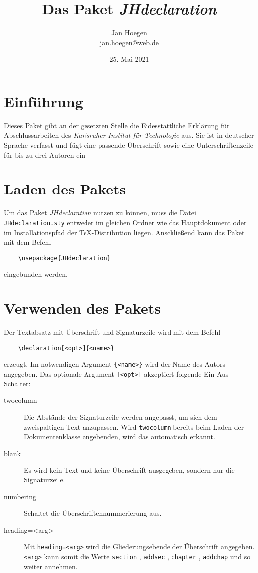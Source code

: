 \documentclass[%
	fontsize=10pt, 
	DIV=8, 
]{scrartcl}
\title{Das Paket \textit{JHdeclaration}}
\author{Jan Hoegen\\\href{mailto:jan.hoegen@web.de}{jan.hoegen@web.de}}
\date{25. Mai 2021}
\begin{document}
\maketitle

\section{Einführung}
Dieses Paket gibt an der gesetzten Stelle die Eidesstattliche Erklärung für Abschlussarbeiten des \textit{Karlsruher Institut für Technologie} aus. Sie ist in deutscher Sprache verfasst und fügt eine passende Überschrift sowie eine Unterschriftenzeile für bis zu drei Autoren ein.

\section{Laden des Pakets}
Um das Paket \textit{JHdeclaration} nutzen zu können, muss die Datei \verb+JHdeclaration.sty+ entweder im gleichen Ordner wie das Hauptdokument oder im Installationspfad der \TeX -Distribution liegen. Anschließend kann das Paket mit dem Befehl
\begin{verbatim}
	\usepackage{JHdeclaration}
\end{verbatim}
eingebunden werden.

\section{Verwenden des Pakets}
Der Textabsatz mit Überschrift und Signaturzeile wird mit dem Befehl 
\begin{verbatim}
	\declaration[<opt>]{<name>}
\end{verbatim}
erzeugt. Im notwendigen Argument \verb+{<name>}+ wird der Name des Autors angegeben. Das optionale Argument \verb+[<opt>]+  akzeptiert folgende Ein-Aus-Schalter:
\begin{description}
	\item[twocolumn] Die Abstände der Signaturzeile werden angepasst, um sich dem zweispaltigen Text anzupassen. Wird \verb+twocolumn+ bereits beim Laden der Dokumentenklasse angebenden, wird das automatisch erkannt. 
	\item[blank] Es wird kein Text und keine Überschrift ausgegeben, sondern nur die Signaturzeile.
	\item[numbering] Schaltet die Überschriftennummerierung aus.
	\item[heading=<arg>] Mit \verb+heading=<arg>+ wird die Gliederungsebende der Überschrift angegeben. \verb+<arg>+ kann somit die Werte \verb+section+ , \verb+addsec+ , \verb+chapter+ , \verb+addchap+ und so weiter annehmen.
\end{description}
\end{document}
